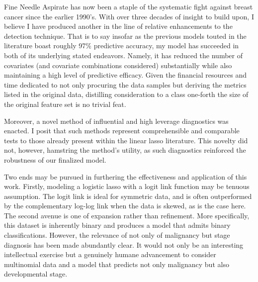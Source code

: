 \documentclass[11pt]{article}
\begin{document}
	Fine Needle Aspirate has now been a staple of the systematic fight against breast cancer since the earlier 1990's.  With over three decades of insight to build upon, I believe I have produced another in the line of relative enhancements to the detection technique.  That is to say insofar as the previous models touted in the literature boast roughly 97\% predictive accuracy, my model has succeeded in both of its underlying stated endeavors.  Namely, it has reduced the number of covariates (and covariate combinations considered) substantially while also maintaining a high level of predictive efficacy.  Given the financial resources and time dedicated to not only procuring the data samples but deriving the metrics listed in the original data, distilling consideration to a class one-forth the size of the original feature set is no trivial feat.  
	
	Moreover, a novel method of influential and high leverage diagnostics was enacted.  I posit that such methods represent comprehensible and comparable tests to those already present within the linear lasso literature.   This novelty did not, however, hamstring the method's utility, as such diagnostics  reinforced the robustness of our finalized model. 
		
	Two ends may be pursued in furthering the effectiveness and application of this work.   Firstly, modeling a logistic lasso with a logit link function may be tenuous assumption.  The logit link is ideal for symmetric data, and is often outperformed by the complementary log-log link when the data is skewed, as is the case here.  The second avenue is one of expansion rather than refinement.  More specifically, this dataset is inherently binary and produces a model that admits binary classifications.  However, the relevance of not only of malignancy but stage diagnosis has been made abundantly clear.  It would not only be an interesting intellectual exercise but a genuinely humane advancement to consider multinomial data and a model that predicts not only malignancy but also developmental stage.  
	
	

	
		 
\newpage
\end{document}
